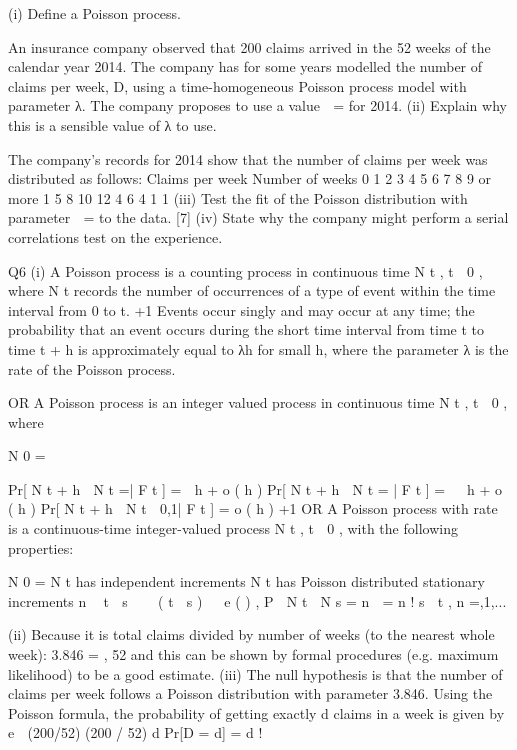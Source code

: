 \documentclass[a4paper,12pt]{article}
\begin{document}
(i)
Define a Poisson process.

An insurance company observed that 200 claims arrived in the 52 weeks of the
calendar year 2014. The company has for some years modelled the number of claims
per week, D, using a time-homogeneous Poisson process model with parameter λ.
The company proposes to use a value  \;= for 2014.
(ii)
Explain why this is a sensible value of λ to use.

The company’s records for 2014 show that the number of claims per week was
distributed as follows:
Claims
per week Number of weeks
0
1
2
3
4
5
6
7
8
9 or more 1
5
8
10
12
4
6
4
1
1
(iii) Test the fit of the Poisson distribution with parameter  \;= to the data.
[7]
(iv) State why the company might perform a serial correlations test on the
experience.

\newpage
Q6
(i)
A Poisson process is a counting process in continuous time { N t , t  0} ,
where N t records the number of occurrences of a type of event within
the time interval from 0 to t. +1
Events occur singly and may occur at any time; 
the probability that an event occurs during the short time interval from time t
to time t + h is approximately equal to λh for small h, where the parameter λ is
the rate of the Poisson process.

OR
A Poisson process is an integer valued process in continuous time { N t , t  0} ,
where

N 0 \;=

Pr[ N t + h  N t \;=| F t ] \;=\;  h + o ( h )
Pr[ N t + h  N t \;= | F t ] \;=   h + o ( h )
Pr[ N t + h  N t  0,1| F t ] \;=\; o ( h )
+1
OR
A Poisson process with rate  is a continuous-time integer-valued process
N t , t  0 , with the following properties:

N 0 \;= 
N t has independent increments 
N t has Poisson distributed stationary increments
n  t  s
   ( t  s )   e ( )
,
P  N t  N s \;=\; n  \;=\;
n !
s  t , n \;=,1,...


(ii)
Because it is total claims divided by number of weeks (to the nearest whole
week):
3.846 \;=
,
52
and this can be shown by formal procedures (e.g. maximum likelihood)
to be a good estimate.
(iii)
The null hypothesis is that the number of claims per week follows a
Poisson distribution with parameter 3.846.
Using the Poisson formula, the probability of getting exactly d claims
in a week is given by
e  (200/52) (200 / 52) d
Pr[D = d] =
d !
\end{document}
